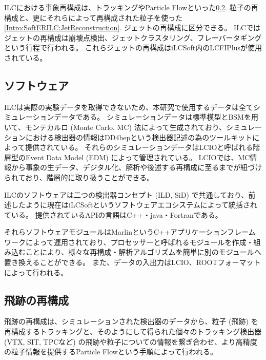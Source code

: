 ILCにおける事象再構成は、トラッキングやParticle Flowといった\ref{Intro:SoftERILC:ParticleReconstruction}. 粒子の再構成と、更にそれらによって再構成された粒子を使った\ref{Intro:SoftERILC:JetReconstruction}. ジェットの再構成に区分できる。
ILCではジェットの再構成は崩壊点検出、ジェットクラスタリング、フレーバータギングという行程で行われる。
これらジェットの再構成はiLCSoft内のLCFIPlus\cite{LCFIPlus}が使用されている。


\subsection{ソフトウェア} \label{Intro:SoftERILC:Software}

ILCは実際の実験データを取得できないため、本研究で使用するデータは全てシミュレーションデータである。
シミュレーションデータは標準模型とBSMを用いて、モンテカルロ (Monte Carlo, MC) 法によって生成されており、シミュレーションにおける検出器の情報はDD4hep\cite{DD4heppaper1, DD4heppaper2}という検出器記述の為のツールキットによって提供されている。
それらのシミュレーションデータはLCIOと呼ばれる階層型のEvent Data Model (EDM) によって管理されている。
LCIOでは、MC情報から事象の生データ、デジタル化、解析や後述する再構成に至るまでが紐づけられており、階層的に取り扱うことができる。

ILCのソフトウェアは二つの検出器コンセプト (ILD, SiD) で共通しており、前述したように現在はiLCSoftというソフトウェアエコシステムによって統括されている。
提供されているAPIの言語はC++・java・Fortranである。

それらソフトウェアモジュールはMarlin\cite{Marlinpaper}というC++アプリケーションフレームワークによって運用されており、プロセッサーと呼ばれるモジュールを作成・組み込むことにより、様々な再構成・解析アルゴリズムを簡単に別のモジュールへ置き換えることができる。
また、データの入出力はLCIO、ROOTフォーマットによって行われる。


\subsection{飛跡の再構成} \label{Intro:SoftERILC:ParticleReconstruction}

飛跡の再構成は、シミュレーションされた検出器のデータから、粒子 (飛跡) を再構成するトラッキングと、そのようにして得られた個々のトラッキング検出器 (VTX, SIT, TPCなど) の飛跡や粒子についての情報を繋ぎ合わせ、より高精度の粒子情報を提供するParticle Flowという手順によって行われる。

